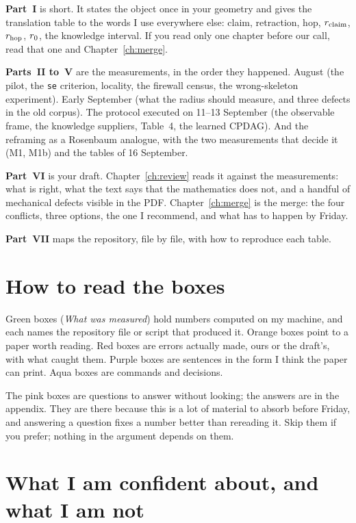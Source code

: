 \textbf{Part~I} is short. It states the object once in your geometry and gives the translation table
to the words I use everywhere else: claim, retraction, hop, $r_{\mathrm{claim}}$, $r_{\mathrm{hop}}$, $r_{0}$, the
knowledge interval. If you read only one chapter before our call, read that one and
Chapter~\ref{ch:merge}.

\textbf{Parts~II to~V} are the measurements, in the order they happened. August (the pilot, the
\texttt{se} criterion, locality, the firewall census, the wrong-skeleton experiment). Early September
(what the radius should measure, and three defects in the old corpus). The protocol executed on
11--13 September (the observable frame, the knowledge suppliers, Table~4, the learned CPDAG). And
the reframing as a Rosenbaum analogue, with the two measurements that decide it (M1, M1b) and the
tables of 16 September.

\textbf{Part~VI} is your draft. Chapter~\ref{ch:review} reads it against the measurements: what is
right, what the text says that the mathematics does not, and a handful of mechanical defects visible
in the PDF. Chapter~\ref{ch:merge} is the merge: the four conflicts, three options, the one I
recommend, and what has to happen by Friday.

\textbf{Part~VII} maps the repository, file by file, with how to reproduce each table.

\section*{How to read the boxes}

Green boxes (\emph{What was measured}) hold numbers computed on my machine, and each names the
repository file or script that produced it. Orange boxes point to a paper worth reading. Red boxes
are errors actually made, ours or the draft's, with what caught them. Purple boxes are sentences in
the form I think the paper can print. Aqua boxes are commands and decisions.

The pink boxes are questions to answer without looking; the answers are in the appendix. They are
there because this is a lot of material to absorb before Friday, and answering a question fixes a
number better than rereading it. Skip them if you prefer; nothing in the argument depends on them.

\digressaoaviso

\section*{What I am confident about, and what I am not}

